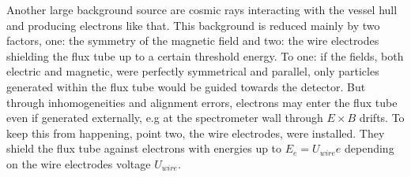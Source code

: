       Another large background source are cosmic rays interacting with the vessel hull and producing electrons like that. This background is reduced mainly by two factors, one: the symmetry of the magnetic field and two: the wire electrodes shielding the flux tube up to a certain threshold energy.
      To one: if the fields, both electric and magnetic, were perfectly symmetrical and parallel, only particles generated within the flux tube would be guided towards the detector. But through inhomogeneities and alignment errors, electrons may enter the flux tube even if generated externally, e.g at the spectrometer wall through $E\times B$ drifts. To keep this from happening, point two, the wire electrodes, were installed. They shield the flux tube against electrons with energies up to $E_e = U_{wire}e$ depending on the wire electrodes voltage $U_{wire}$. 